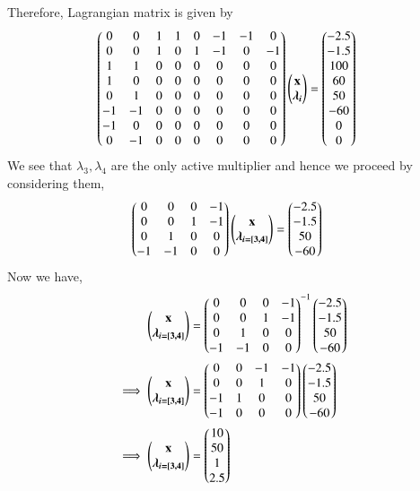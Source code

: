 \documentclass[journal,12pt,twocolumn]{IEEEtran}
\begin{document}
Therefore, Lagrangian matrix is given by
\begin{align}
    \begin{pmatrix}0 & 0 & 1 & 1 & 0 & -1 & -1 & 0 \\ 0 & 0 & 1 & 0 & 1 & -1 & 0 & -1 \\ 1 & 1 & 0 & 0 & 0 & 0 & 0 & 0 \\ 1 & 0 & 0 & 0 & 0 & 0 & 0 & 0 \\ 0 & 1 & 0 & 0 & 0 & 0 & 0 & 0 \\ -1 & -1 & 0 & 0 & 0 & 0 & 0 & 0 \\ -1 & 0 & 0 & 0 & 0 & 0 & 0 & 0 \\ 0 & -1 & 0 & 0 & 0 & 0 & 0 & 0 \end{pmatrix}\begin{pmatrix}\mathbf{x} \\ \boldsymbol{\lambda_i}\end{pmatrix} &= \begin{pmatrix}-2.5 \\ -1.5 \\ 100 \\ 60 \\ 50 \\ -60 \\0 \\ 0 \end{pmatrix}
\end{align}
We see that $\lambda_3,\lambda_4$ are the only active multiplier and hence we proceed by considering them,
\begin{align}
    \begin{pmatrix}0 & 0 & 0 & -1 \\ 0 & 0 & 1 & -1 \\ 0 & 1 & 0 & 0 \\ -1 & -1 & 0 & 0\end{pmatrix}\begin{pmatrix}\mathbf{x}\\ \boldsymbol{\lambda_{i=[3,4]}}\end{pmatrix} &= \begin{pmatrix}-2.5 \\ -1.5 \\ 50 \\ -60\end{pmatrix}
\end{align}
Now we have,
\begin{align}
    \begin{pmatrix}\mathbf{x} \\ \boldsymbol{\lambda_{i=[3,4]}}\end{pmatrix} &= \begin{pmatrix}0 & 0 & 0 & -1 \\ 0 & 0 & 1 & -1 \\ 0 & 1 & 0 & 0 \\ -1 & -1 & 0 & 0\end{pmatrix}^{-1}\begin{pmatrix}-2.5 \\ -1.5 \\ 50 \\ -60\end{pmatrix}
    \\
    \implies   \begin{pmatrix}\mathbf{x} \\ \boldsymbol{\lambda_{i=[3,4]}}\end{pmatrix} &= \begin{pmatrix}0 & 0 & -1 & -1 \\ 0 & 0 & 1 & 0 \\ -1 & 1 & 0 & 0 \\ -1 & 0 & 0 & 0\end{pmatrix}\begin{pmatrix}-2.5 \\ -1.5 \\ 50 \\ -60\end{pmatrix}
    \\
    \implies \begin{pmatrix}\mathbf{x} \\ \boldsymbol{\lambda_{i=[3,4]}}\end{pmatrix} &= \begin{pmatrix}10 \\ 50 \\ 1 \\ 2.5\end{pmatrix}
\end{align}
\end{document}
